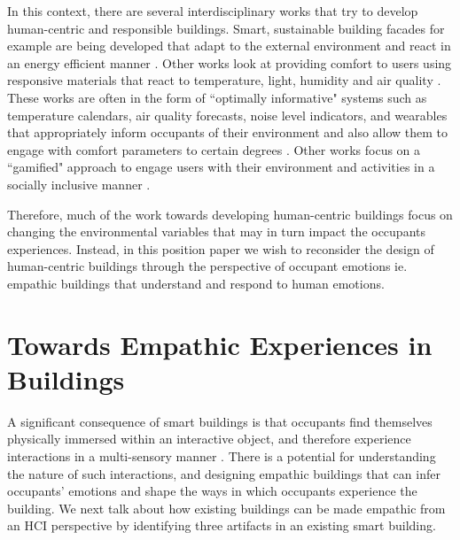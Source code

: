 \documentclass[manuscript, anonymous, review]{acmart}
\begin{document}
In this context, there are several interdisciplinary works that try to develop human-centric and responsible buildings. Smart, sustainable building facades for example are being developed that adapt to the external environment and react in an energy efficient manner \cite{ahmed2015development}. Other works look at providing comfort to users using responsive materials that react to temperature, light, humidity and air quality \cite{fragkia2020exergy, holstov2015hygromorphic}. These works are often in the form of ``optimally informative" systems such as temperature calendars, air quality forecasts, noise level indicators, and wearables that appropriately inform occupants of their environment and also allow them to engage with comfort parameters to certain degrees  \cite{costanza2016bit, kim2020designing}. Other works focus on a ``gamified" approach to engage users with their environment and activities in a socially inclusive manner \cite{mathur2015tiny, zhong2022augmenting}. 

Therefore, much of the work towards developing human-centric buildings focus on changing the environmental variables that may in turn impact the occupants experiences. Instead, in this position paper we wish to reconsider the design of human-centric buildings through the perspective of occupant emotions ie. empathic buildings that understand and respond to human emotions.





\section{Towards Empathic Experiences in Buildings}
\label{sec:empathic-buildings}
A significant consequence of smart buildings is that occupants find themselves physically immersed within an interactive object, and therefore experience interactions in a multi-sensory manner \cite{nembrini2017human}. There is a potential for understanding the nature of such interactions, and designing empathic buildings that can infer occupants' emotions and shape the ways in which occupants experience the building. We next talk about how existing buildings can be made empathic from an HCI perspective by identifying three artifacts in an existing smart building.  
 
\end{document}
